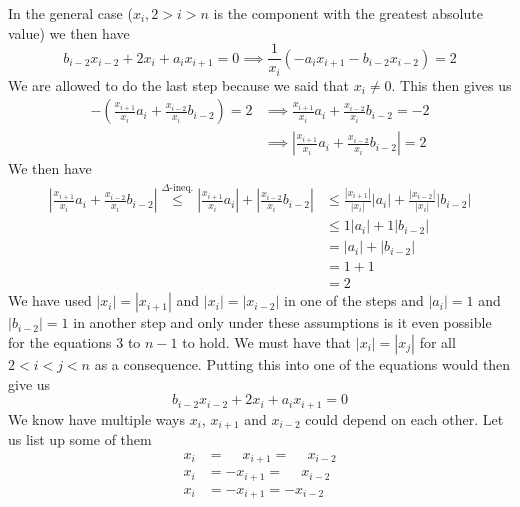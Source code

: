 \documentclass{article}
\begin{document}
\noindent In the general case ($x_{i}, 2 > i > n$ is the component with the greatest absolute value) we then have 
\begin{equation*}
    b_{i-2}x_{i-2} + 2x_{i} + a_{i}x_{i+1} = 0 \implies \frac{1}{x_{i}}\left(-a_{i}x_{i+1} - b_{i-2}x_{i-2}\right) = 2
\end{equation*}
We are allowed to do the last step because we said that $x_{i} \neq 0$. This then gives us
\begin{align*}
    -\left(\frac{x_{i+1}}{x_{i}}a_{i} + \frac{x_{i-2}}{x_{i}}b_{i-2}\right) = 2 &\implies \frac{x_{i+1}}{x_{i}}a_{i} + \frac{x_{i-2}}{x_{i}}b_{i-2} = -2 \\
    &\implies \left\lvert \frac{x_{i+1}}{x_{i}}a_{i} + \frac{x_{i-2}}{x_{i}}b_{i-2}\right\rvert =2
\end{align*}
We then have 
\begin{align*}
    \left\lvert \frac{x_{i+1}}{x_{i}}a_{i} + \frac{x_{i-2}}{x_{i}}b_{i-2}\right\rvert \overset{\Delta\text{-ineq.}}{\leq} \left\lvert \frac{x_{i+1}}{x_{i}}a_{i}\right\rvert  + \left\lvert \frac{x_{i-2}}{x_{i}}b_{i-2}\right\rvert  &\leq \frac{\left\lvert x_{i+1}\right\rvert }{\left\lvert x_{i}\right\rvert }\left\lvert a_{i}\right\rvert  + \frac{\left\lvert x_{i-2} \right\rvert }{\left\lvert x_{i}\right\rvert }\left\lvert b_{i-2}\right\rvert  \\[2mm]
    &\leq 1\left\lvert a_{i}\right\rvert  + 1\left\lvert b_{i-2}\right\rvert \\
    &= \left\lvert a_{i}\right\rvert  + \left\lvert b_{i-2}\right\rvert \\
    &= 1 + 1 \\ 
    &= 2
\end{align*}
We have used $\left\lvert x_{i} \right\rvert = \left\lvert x_{i+1} \right\rvert$ and $\left\lvert x_{i} \right\rvert = \left\lvert x_{i-2} \right\rvert$ in one of the steps and $\left\lvert a_{i}\right\rvert = 1$ and $\left\lvert b_{i-2}\right\rvert = 1$ in another step and only under these assumptions is it even possible for the equations $3$ to $n-1$ to hold. We must have that $\left\lvert x_{i}\right\rvert = \left\lvert x_{j}\right\rvert $ for all $2 < i < j < n$ as a consequence. Putting this into one of the equations would then give us
\begin{equation}
    b_{i-2}x_{i-2} + 2x_{i} + a_{i}x_{i+1} = 0
\end{equation}
We know have multiple ways $x_{i}$, $x_{i+1}$ and $x_{i-2}$ could depend on each other. Let us list up some of them
\begin{align*}
    x_{i} &= \phantom{-}x_{i +1} = \phantom{-}x_{i-2} \\
    x_{i} &= -x_{i +1} = \phantom{-}x_{i-2} \\
    x_{i} &= -x_{i +1} = -x_{i-2} \\
\end{align*}
\end{document}
